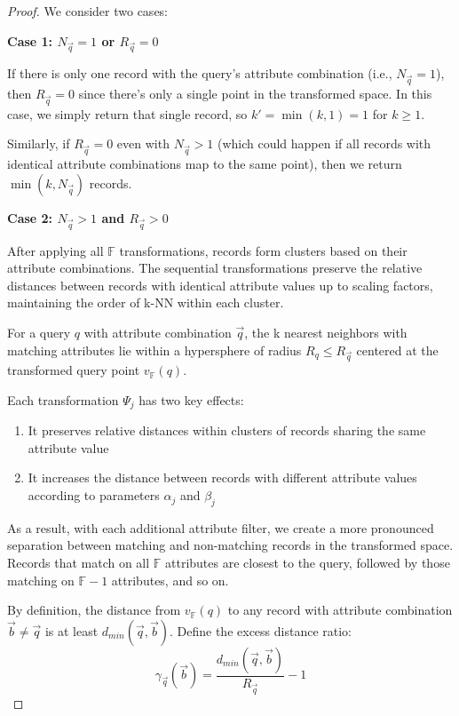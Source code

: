 \documentclass[numbers,sort]{article}
\begin{document}
\begin{proof}
We consider two cases:

\textbf{Case 1: $N_{\vec{q}} = 1$ or $R_{\vec{q}} = 0$}

If there is only one record with the query's attribute combination (i.e., $N_{\vec{q}} = 1$), then $R_{\vec{q}} = 0$ since there's only a single point in the transformed space. In this case, we simply return that single record, so $k' = \min(k, 1) = 1$ for $k \geq 1$.

Similarly, if $R_{\vec{q}} = 0$ even with $N_{\vec{q}} > 1$ (which could happen if all records with identical attribute combinations map to the same point), then we return $\min(k, N_{\vec{q}})$ records.

\textbf{Case 2: $N_{\vec{q}} > 1$ and $R_{\vec{q}} > 0$}

After applying all $\mathbb{F}$ transformations, records form clusters based on their attribute combinations. The sequential transformations preserve the relative distances between records with identical attribute values up to scaling factors, maintaining the order of k-NN within each cluster.

For a query $q$ with attribute combination $\vec{q}$, the k nearest neighbors with matching attributes lie within a hypersphere of radius $R_q \leq R_{\vec{q}}$ centered at the transformed query point $v_{\mathbb{F}}(q)$.

Each transformation $\Psi_j$ has two key effects:
\begin{enumerate}
\item It preserves relative distances within clusters of records sharing the same attribute value
\item It increases the distance between records with different attribute values according to parameters $\alpha_j$ and $\beta_j$
\end{enumerate}

As a result, with each additional attribute filter, we create a more pronounced separation between matching and non-matching records in the transformed space. Records that match on all $\mathbb{F}$ attributes are closest to the query, followed by those matching on $\mathbb{F}-1$ attributes, and so on.

By definition, the distance from $v_{\mathbb{F}}(q)$ to any record with attribute combination $\vec{b} \neq \vec{q}$ is at least $d_{min}(\vec{q}, \vec{b})$. Define the excess distance ratio:
\begin{equation}
\gamma_{\vec{q}}(\vec{b}) = \frac{d_{min}(\vec{q}, \vec{b})}{R_{\vec{q}}} - 1
\end{equation}


\end{proof}
\end{document}
